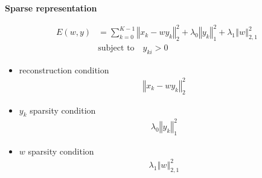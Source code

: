 \documentclass[xcolor=dvipsnames]{beamer}
\begin{document}
\begin{frame}{\bf Sparse representation}

\begin{align*}
E(w, y) &= \sum_{k=0}^{K-1} \left\Vert x_k - wy_k \right\Vert^2_2 + \lambda_0 \left\Vert y_k \right\Vert^2_1 + \lambda_1 \left\Vert w \right\Vert^2_{2,1} \\
&\text{subject to} \quad y_{ki} > 0
\end{align*}

\begin{itemize}
  \item
      reconstruction condition
      \begin{align*}
      \left\Vert x_k - wy_k \right\Vert^2_2
      \end{align*}
      \color{black}


  \item
      $y_k$ sparsity condition
      \begin{align*}
      \lambda_0 \left\Vert y_k \right\Vert^2_1
      \end{align*}


  \item
      $w$ sparsity condition
      \begin{align*}
      \lambda_1 \left\Vert w \right\Vert^2_{2,1}
      \end{align*}
\end{itemize}

\end{frame}
\end{document}
